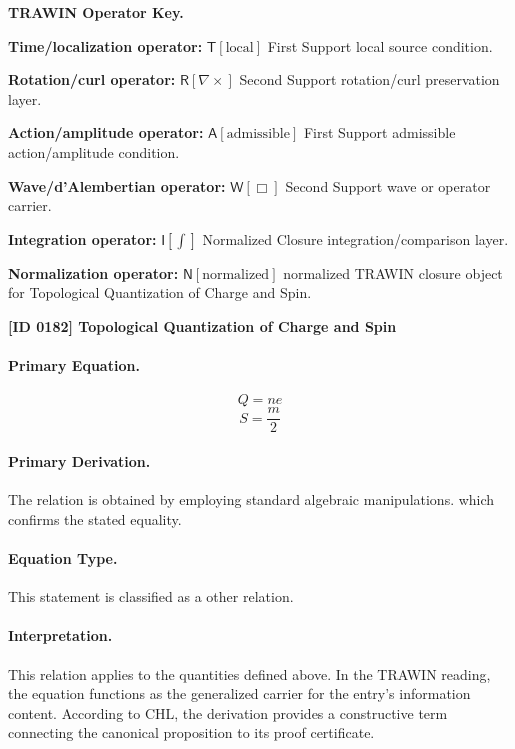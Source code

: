 \par\vspace{0.45\baselineskip}
\noindent\begin{minipage}[t]{\linewidth}
\begingroup
\small
\raggedright
\textbf{TRAWIN Operator Key.}\par
\noindent\textbf{Time/localization operator:} $\mathsf{T}\!\left[\mathrm{local}\right]$ First Support local source condition.\par
\noindent\textbf{Rotation/curl operator:} $\mathsf{R}\!\left[\nabla\times\right]$ Second Support rotation/curl preservation layer.\par
\noindent\textbf{Action/amplitude operator:} $\mathsf{A}\!\left[\mathrm{admissible}\right]$ First Support admissible action/amplitude condition.\par
\noindent\textbf{Wave/d'Alembertian operator:} $\mathsf{W}\!\left[\Box\right]$ Second Support wave or operator carrier.\par
\noindent\textbf{Integration operator:} $\mathsf{I}\!\left[\int\right]$ Normalized Closure integration/comparison layer.\par
\noindent\textbf{Normalization operator:} $\mathsf{N}\!\left[\mathrm{normalized}\right]$ normalized TRAWIN closure object for Topological Quantization of Charge and Spin.\par
\endgroup
\end{minipage}

\clearpage
\noindent\textbf{[ID 0182] Topological Quantization of Charge and Spin}\par
\vspace{0.35em}
\paragraph{Primary Equation.}
\[
Q = n e
\]
\[
S = \frac{m}{2}
\]

\paragraph{Primary Derivation.}
The relation is obtained by employing standard algebraic manipulations. which confirms the stated equality.
\paragraph{Equation Type.}
This statement is classified as a other relation.

\paragraph{Interpretation.}
This relation applies to the quantities defined above. In the TRAWIN reading, the equation functions as the generalized carrier for the entry’s information content. According to CHL, the derivation provides a constructive term connecting the canonical proposition to its proof certificate.

